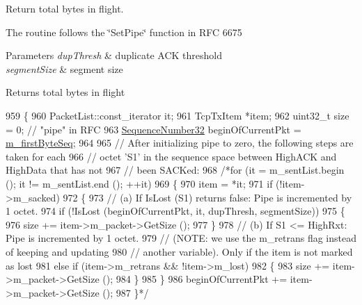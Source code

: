 Return total bytes in flight. 

The routine follows the \char`\"{}\+Set\+Pipe\char`\"{} function in R\+FC 6675


\begin{DoxyParams}{Parameters}
{\em dup\+Thresh} & duplicate A\+CK threshold \\
\hline
{\em segment\+Size} & segment size \\
\hline
\end{DoxyParams}
\begin{DoxyReturn}{Returns}
total bytes in flight 
\end{DoxyReturn}

\begin{DoxyCode}
959 \{
960   PacketList::const\_iterator it;
961   TcpTxItem *item;
962   uint32\_t size = 0; \textcolor{comment}{// "pipe" in RFC}
963   \hyperlink{group__network_gacb2070e4e98d2d5135c9bede58f07a03}{SequenceNumber32} beginOfCurrentPkt = \hyperlink{classns3_1_1TcpTxBuffer_a46b67e5cb3396b43a41dd3fd5b135346}{m\_firstByteSeq};
964 
965   \textcolor{comment}{// After initializing pipe to zero, the following steps are taken for each}
966   \textcolor{comment}{// octet 'S1' in the sequence space between HighACK and HighData that has not}
967   \textcolor{comment}{// been SACKed:}
968   \textcolor{comment}{/*for (it = m\_sentList.begin (); it != m\_sentList.end (); ++it)}
969 \textcolor{comment}{    \{}
970 \textcolor{comment}{      item = *it;}
971 \textcolor{comment}{      if (!item->m\_sacked)}
972 \textcolor{comment}{        \{}
973 \textcolor{comment}{          // (a) If IsLost (S1) returns false: Pipe is incremented by 1 octet.}
974 \textcolor{comment}{          if (!IsLost (beginOfCurrentPkt, it, dupThresh, segmentSize))}
975 \textcolor{comment}{            \{}
976 \textcolor{comment}{              size += item->m\_packet->GetSize ();}
977 \textcolor{comment}{            \}}
978 \textcolor{comment}{          // (b) If S1 <= HighRxt: Pipe is incremented by 1 octet.}
979 \textcolor{comment}{          // (NOTE: we use the m\_retrans flag instead of keeping and updating}
980 \textcolor{comment}{          // another variable). Only if the item is not marked as lost}
981 \textcolor{comment}{          else if (item->m\_retrans && !item->m\_lost)}
982 \textcolor{comment}{            \{}
983 \textcolor{comment}{              size += item->m\_packet->GetSize ();}
984 \textcolor{comment}{            \}}
985 \textcolor{comment}{        \}}
986 \textcolor{comment}{      beginOfCurrentPkt += item->m\_packet->GetSize ();}
987 \textcolor{comment}{    \}*/}

\end{DoxyCode}
